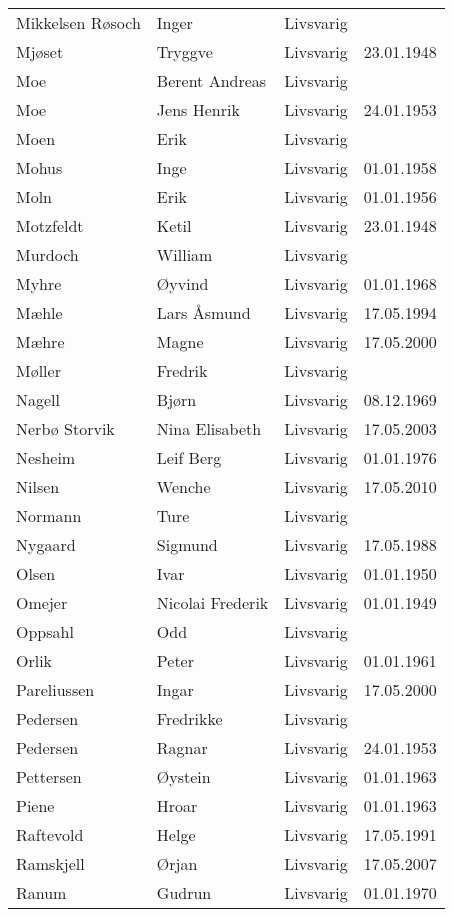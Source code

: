 \begin{longtable}{llll}
Mikkelsen Røsoch	&	Inger	&	Livsvarig 	&		\\
Mjøset	&	Tryggve	&	Livsvarig 	&	23.01.1948	\\
Moe	&	Berent Andreas	&	Livsvarig 	&		\\
Moe	&	Jens Henrik	&	Livsvarig 	&	24.01.1953	\\
Moen	&	Erik	&	Livsvarig 	&		\\
Mohus	&	Inge	&	Livsvarig 	&	01.01.1958	\\
Moln	&	Erik	&	Livsvarig 	&	01.01.1956	\\
Motzfeldt	&	Ketil	&	Livsvarig 	&	23.01.1948	\\
Murdoch	&	William	&	Livsvarig 	&		\\
Myhre	&	Øyvind	&	Livsvarig 	&	01.01.1968	\\
Mæhle	&	Lars Åsmund	&	Livsvarig 	&	17.05.1994	\\
Mæhre	&	Magne	&	Livsvarig	&	17.05.2000	\\
Møller	&	Fredrik	&	Livsvarig 	&		\\
Nagell	&	Bjørn	&	Livsvarig 	&	08.12.1969	\\
Nerbø Storvik 	&	Nina Elisabeth	&	Livsvarig	&	17.05.2003	\\
Nesheim	&	Leif Berg	&	Livsvarig 	&	01.01.1976	\\
Nilsen	&	Wenche	&	Livsvarig	&	17.05.2010	\\
Normann	&	Ture	&	Livsvarig 	&		\\
Nygaard	&	Sigmund	&	Livsvarig 	&	17.05.1988	\\
Olsen	&	Ivar	&	Livsvarig 	&	01.01.1950	\\
Omejer	&	Nicolai Frederik	&	Livsvarig 	&	01.01.1949	\\
Oppsahl	&	Odd	&	Livsvarig 	&		\\
Orlik	&	Peter	&	Livsvarig 	&	01.01.1961	\\
Pareliussen	&	Ingar	&	Livsvarig	&	17.05.2000	\\
Pedersen	&	Fredrikke	&	Livsvarig 	&		\\
Pedersen	&	Ragnar	&	Livsvarig 	&	24.01.1953	\\
Pettersen	&	Øystein	&	Livsvarig 	&	01.01.1963	\\
Piene	&	Hroar	&	Livsvarig 	&	01.01.1963	\\
Raftevold	&	Helge	&	Livsvarig 	&	17.05.1991	\\
Ramskjell	&	Ørjan	&	Livsvarig	&	17.05.2007	\\
Ranum	&	Gudrun	&	Livsvarig 	&	01.01.1970	\\

\end{longtable}
